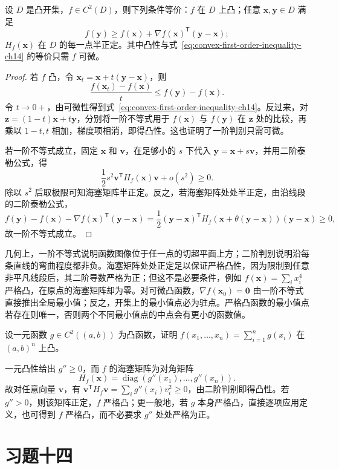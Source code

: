 \begin{theorem}[凸函数的一阶与二阶判别]
\label{thm:multivariable-convexity-tests-ch14}
设 $D$ 是凸开集，$f\in C^2(D)$，则下列条件等价：$f$ 在 $D$ 上凸；任意 $\boldsymbol x,\boldsymbol y\in D$ 满足
\begin{equation}
\label{eq:convex-first-order-inequality-ch14}
    f(\boldsymbol y)\geq f(\boldsymbol x)
       +\nabla f(\boldsymbol x)^{\mathsf T}(\boldsymbol y-\boldsymbol x);
\end{equation}
$H_f(\boldsymbol x)$ 在 $D$ 的每一点半正定。其中凸性与式~\eqref{eq:convex-first-order-inequality-ch14} 的等价只需 $f$ 可微。
\end{theorem}
\begin{proof}
若 $f$ 凸，令 $\boldsymbol x_t=\boldsymbol x+t(\boldsymbol y-\boldsymbol x)$，则
\[
    \frac{f(\boldsymbol x_t)-f(\boldsymbol x)}t
       \leq f(\boldsymbol y)-f(\boldsymbol x).
\]
令 $t\to0+$，由可微性得到式~\eqref{eq:convex-first-order-inequality-ch14}。反过来，对 $\boldsymbol z=(1-t)\boldsymbol x+t\boldsymbol y$，分别将一阶不等式用于 $f(\boldsymbol x)$ 与 $f(\boldsymbol y)$ 在 $\boldsymbol z$ 处的比较，再乘以 $1-t,t$ 相加，梯度项相消，即得凸性。这也证明了一阶判别只需可微。

若一阶不等式成立，固定 $\boldsymbol x$ 和 $\boldsymbol v$，在足够小的 $s$ 下代入 $\boldsymbol y=\boldsymbol x+s\boldsymbol v$，并用二阶泰勒公式，得
\[
    \frac12s^2\boldsymbol v^{\mathsf T}H_f(\boldsymbol x)\boldsymbol v+o(s^2)\geq0.
\]
除以 $s^2$ 后取极限可知海塞矩阵半正定。反之，若海塞矩阵处处半正定，由沿线段的二阶泰勒公式，
\[
    f(\boldsymbol y)-f(\boldsymbol x)-\nabla f(\boldsymbol x)^{\mathsf T}(\boldsymbol y-\boldsymbol x)
    =\frac12(\boldsymbol y-\boldsymbol x)^{\mathsf T}
       H_f(\boldsymbol x+\theta(\boldsymbol y-\boldsymbol x))
       (\boldsymbol y-\boldsymbol x)\geq0,
\]
故一阶不等式成立。
\end{proof}

几何上，一阶不等式说明函数图像位于任一点的切超平面上方；二阶判别说明沿每条直线的弯曲程度都非负。海塞矩阵处处正定足以保证严格凸性，因为限制到任意非平凡线段后，其二阶导数严格为正；但这不是必要条件，例如 $f(\boldsymbol x)=\sum_i x_i^4$ 严格凸，在原点的海塞矩阵却为零。对可微凸函数，$\nabla f(\boldsymbol x_0)=\boldsymbol0$ 由一阶不等式直接推出全局最小值；反之，开集上的最小值点必为驻点。严格凸函数的最小值点若存在则唯一，否则两个不同最小值点的中点会有更小的函数值。

\begin{example}
\label{ex:separable-convex-function-ch14}
设一元函数 $g\in C^2((a,b))$ 为凸函数，证明 $f(x_1,\ldots,x_n)=\sum_{i=1}^n g(x_i)$ 在 $(a,b)^n$ 上凸。
\end{example}
\begin{solve}
一元凸性给出 $g''\geq0$，而 $f$ 的海塞矩阵为对角矩阵
\[
    H_f(\boldsymbol x)=\operatorname{diag}(g''(x_1),\ldots,g''(x_n)).
\]
故对任意向量 $\boldsymbol v$，有 $\boldsymbol v^{\mathsf T}H_f\boldsymbol v=\sum_i g''(x_i)v_i^2\geq0$，由二阶判别即得凸性。若 $g''>0$，则该矩阵正定，$f$ 严格凸；更一般地，若 $g$ 本身严格凸，直接逐项应用定义，也可得到 $f$ 严格凸，而不必要求 $g''$ 处处严格为正。
\end{solve}


\section*{习题十四}
